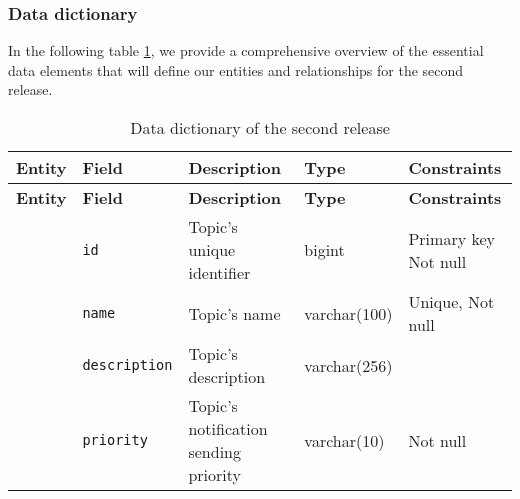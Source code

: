 \subsubsection{Data dictionary}
In the following table \ref{tab-r2dd}, we provide a comprehensive overview of the essential data elements
that will define our entities and relationships for the second release.

\begin{landscape}
    \begin{longtable}{ | m{} | m{} | m{} | m{} | m{} | }
        \caption{Data dictionary of the second release}   \label{tab-r2dd}                                                                                                                                                                  \\
        \hline
        \textbf{Entity}                                                  & \textbf{Field}                            & \textbf{Description}                                                 & \textbf{Type} & \textbf{Constraints}          \\
        \hline
        \endfirsthead
        \hline
        \textbf{Entity}                                                  & \textbf{Field}                            & \textbf{Description}                                                 & \textbf{Type} & \textbf{Constraints}          \\
        \hline
        \endhead
        \hline
        \endfoot
        \endlastfoot
        \multirow[t]{5}{5em}{\textbf{Topic}}                             & \texttt{id}                               & Topic's unique identifier                                            & bigint        & Primary key \newline Not null \\
        \cline{2-5}
                                                                         & \texttt{name}                             & Topic's name                                                         & varchar(100)  & Unique, Not null              \\
        \cline{2-5}
                                                                         & \texttt{description}                      & Topic's description                                                  & varchar(256)  &                               \\
        \cline{2-5}
                                                                         & \texttt{priority}                         & Topic's notification sending priority                                & varchar(10)   & Not null                      \\

\end{longtable}
\end{landscape}
